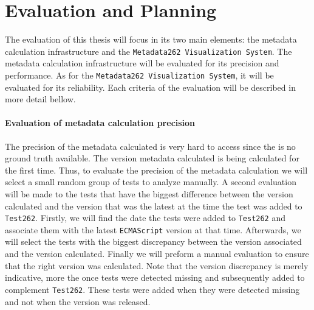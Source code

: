 \documentclass[runningheads]{llncs}
\begin{document}
\section{Evaluation and Planning}
\label{sec:Evaluation and Planning}





The evaluation of this thesis will focus in its two main elements: the metadata calculation infrastructure and the \texttt{Metadata262 Visualization System}. The metadata calculation infrastructure will be evaluated for its precision and performance. As for the \texttt{Metadata262 Visualization System}, it will be evaluated for its reliability. Each criteria of the evaluation will be described in more detail bellow.

\paragraph{Evaluation of metadata calculation precision}
The precision of the metadata calculated is very hard to access since the is no ground truth available. The version metadata calculated is being calculated for the first time. Thus, to evaluate the precision of the metadata calculation we will select a small random group of tests to analyze manually. A second evaluation will be made to the tests that have the biggest difference between the version calculated and the version that was the latest at the time the test was added to \texttt{Test262}. Firstly, we will find the date the tests were added to \texttt{Test262} and associate them with the latest \texttt{ECMAScript} version at that time. Afterwards, we will select the tests with the biggest discrepancy between the version associated and the version calculated. Finally we will preform a manual evaluation to ensure that the right version was calculated. Note that the version discrepancy is merely indicative, more the once tests were detected missing and subsequently added to complement \texttt{Test262}. These tests were added when they were detected missing and not when the version was released.
\end{document}
